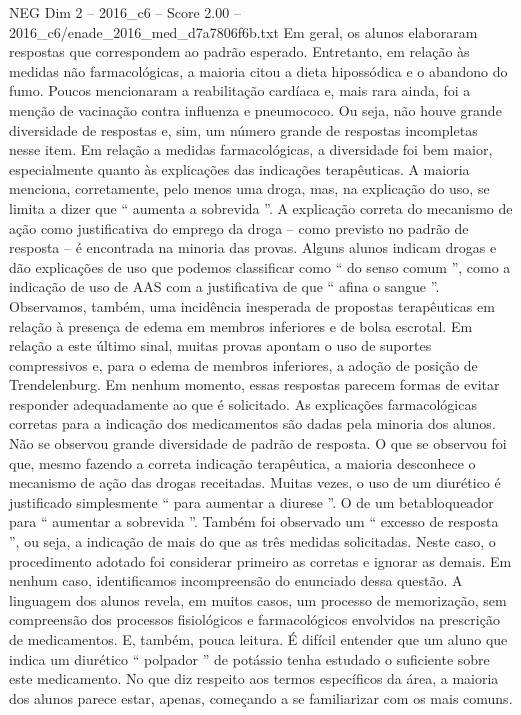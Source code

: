 \begin{textsample}{NEG Dim 2 – 2016\_c6 – Score 2.00 – 2016\_c6/enade\_2016\_med\_d7a7806f6b.txt}
Em geral, os alunos elaboraram respostas que correspondem ao padrão esperado.
Entretanto, em relação às medidas não farmacológicas, a maioria citou a dieta hipossódica e o abandono do fumo.
Poucos mencionaram a reabilitação cardíaca e, mais rara ainda, foi a menção de vacinação contra influenza e pneumococo.
Ou seja, não houve grande diversidade de respostas e, sim, um número grande de respostas incompletas nesse item.
Em relação a medidas farmacológicas, a diversidade foi bem maior, especialmente quanto às explicações das indicações terapêuticas.
A maioria menciona, corretamente, pelo menos uma droga, mas, na explicação do uso, se limita a dizer que “ aumenta a sobrevida ”.
A explicação correta do mecanismo de ação como justificativa do emprego da droga – como previsto no padrão de resposta – é encontrada na minoria das provas.
Alguns alunos indicam drogas e dão explicações de uso que podemos classificar como “ do senso comum ”, como a indicação de uso de AAS com a justificativa de que “ afina o sangue ”.
Observamos, também, uma incidência inesperada de propostas terapêuticas em relação à presença de edema em membros inferiores e de bolsa escrotal.
Em relação a este último sinal, muitas provas apontam o uso de suportes compressivos e, para o edema de membros inferiores, a adoção de posição de Trendelenburg.
Em nenhum momento, essas respostas parecem formas de evitar responder adequadamente ao que é solicitado.
As explicações farmacológicas corretas para a indicação dos medicamentos são dadas pela minoria dos alunos.
Não se observou grande diversidade de padrão de resposta.
O que se observou foi que, mesmo fazendo a correta indicação terapêutica, a maioria desconhece o mecanismo de ação das drogas receitadas.
Muitas vezes, o uso de um diurético é justificado simplesmente “ para aumentar a diurese ”.
O de um betabloqueador para “ aumentar a sobrevida ”.
Também foi observado um “ excesso de resposta ”, ou seja, a indicação de mais do que as três medidas solicitadas.
Neste caso, o procedimento adotado foi considerar primeiro as corretas e ignorar as demais.
Em nenhum caso, identificamos incompreensão do enunciado dessa questão.
A linguagem dos alunos revela, em muitos casos, um processo de memorização, sem compreensão dos processos fisiológicos e farmacológicos envolvidos na prescrição de medicamentos.
E, também, pouca leitura.
É difícil entender que um aluno que indica um diurético “ polpador ” de potássio tenha estudado o suficiente sobre este medicamento.
No que diz respeito aos termos específicos da área, a maioria dos alunos parece estar, apenas, começando a se familiarizar com os mais comuns.

\end{textsample}
